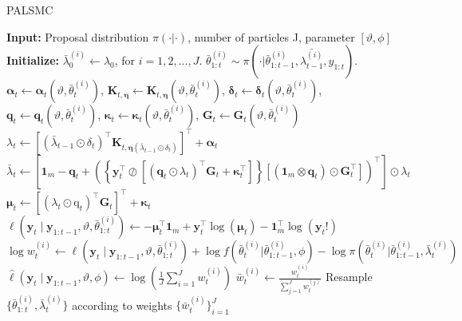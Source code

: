 \documentclass[10pt]{article}
\begin{document}
\begin{algorithm}[H]
\caption{PALSMC}
\begin{algorithmic}[1]
\Statex \textbf{Input: } Proposal distribution $\pi(\cdot|\cdot)$, number of particles J, parameter $[\vartheta, \phi]$
\Statex \textbf{Initialize: }$\bar{\lambda}^{(i)}_0 \leftarrow \lambda_0$, for $i =1,2,...,J$.
    \State $\bar{\theta}^{(i)}_{1:t} \sim \pi(\cdot|\bar{\theta}^{(i)}_{1:t-1}, \bar{\lambda^{(i)}_{t-1}},y_{1:t})$.
    \State $\boldsymbol{\alpha}_t \leftarrow \boldsymbol{\alpha}_t(\vartheta,\bar{\theta}^{(i)}_{t})$, 
    $\mathbf{K}_{t, \boldsymbol{\eta}} \leftarrow \mathbf{K}_{t, \boldsymbol{\eta}}(\vartheta,\bar{\theta}^{(i)}_{t})$, 
    $\boldsymbol{\delta}_t \leftarrow \boldsymbol{\delta}_t(\vartheta,\bar{\theta}^{(i)}_{t})$, 
    $\boldsymbol{q}_t \leftarrow \boldsymbol{q}_t(\vartheta,\bar{\theta}^{(i)}_{t})$,
    \Statex
    \quad \quad \quad $\boldsymbol{\kappa}_t \leftarrow \boldsymbol{\kappa}_t(\vartheta,\bar{\theta}^{(i)}_{t})$,
    $\boldsymbol{G}_t \leftarrow \boldsymbol{G}_t(\vartheta,\bar{\theta}^{(i)}_{t})$
    \State $\lambda_t \leftarrow\left[\left(\bar{\lambda}_{t-1} \odot \delta_t\right)^{\top} \mathbf{K}_{t, \boldsymbol{\eta}\left(\bar{\lambda}_{t-1} \odot \delta_t\right)}\right]^{\top}+\boldsymbol{\alpha}_t$
    \State $\bar{\lambda}_t \leftarrow\left[\mathbf{1}_m-\mathbf{q}_t+\left(\left\{\mathbf{y}_t^{\top} \oslash\left[\left(\mathbf{q}_t \odot \lambda_t\right)^{\top} \mathbf{G}_t+\boldsymbol{\kappa}_t^{\top}\right]\right\}\left[\left(\mathbf{1}_m \otimes \mathbf{q}_t\right) \odot \mathbf{G}_t^{\top}\right]\right)^{\top}\right] \odot \lambda_t$
    \State $\boldsymbol{\mu}_t \leftarrow\left[\left(\lambda_t \odot \mathrm{q}_t\right)^{\top} \mathbf{G}_t\right]^{\top}+\boldsymbol{\kappa}_t$
    \State $\ell\left(\mathbf{y}_t \mid \mathbf{y}_{1: t-1}, \vartheta, \bar{\theta}^{(i)}_{1:t}\right) \leftarrow-\boldsymbol{\mu}_t^{\top} \mathbf{1}_m+\mathbf{y}_t^{\top} \log \left(\boldsymbol{\mu}_t\right)-\mathbf{1}_m^{\top} \log \left(\mathbf{y}_{t} !\right)$
    \State $\log{w^{(i)}_t} \leftarrow \ell\left(\mathbf{y}_t \mid \mathbf{y}_{1: t-1}, \vartheta, \bar{\theta}^{(i)}_{1:t}\right) + \log{f(\bar{\theta}^{(i)}_{t}|\bar{\theta}^{(i)}_{1:t-1}, \phi)}-\log{\pi(\bar{\theta}^{(i)}_{t}|\bar{\theta}^{(i)}_{1:t-1},\bar{\lambda}^{(i)}_t)}$
    \EndFor
    \State $\hat{\ell}\left(\mathbf{y}_t \mid \mathbf{y}_{1: t-1}, \vartheta, \phi\right) \leftarrow \log\left({\frac{1}{J}\sum_{i=1}^{J}w_{t}^{(i)}}\right)$
    \State $\bar{w}_{t}^{(i)}\leftarrow \frac{w_{t}^{(i)}}{\sum_{j=1}^{J}w_{t}^{(j)}}$
    \State Resample $\{\bar{\theta}^{(i)}_{1:t}, \bar{\lambda}_{t}^{(i)}\}$ according to weights $\{\bar{w}_{t}^{(i)}\}_{i=1}^{J}$
\EndFor
\end{algorithmic}
\end{algorithm}
\end{document}

